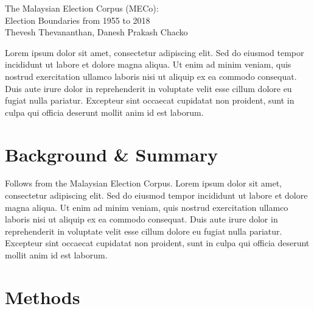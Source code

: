 \documentclass[11pt]{article}
\begin{document}
\def\acronymend{MECo}
\def\acronym{\acronymend\space}

\phantom{Thevesh}

\vfill

\begin{center}
	\begin{minipage}{0.88\linewidth}
		\begin{center}
			\LARGE
			The Malaysian Election Corpus (\acronymend):\\Election Boundaries from 1955 to 2018 \\[0.21in]
			\Large
			Thevesh Thevananthan, Danesh Prakash Chacko\\[0.15in]  %
		\end{center}
		\large 
		Lorem ipsum dolor sit amet, consectetur adipiscing elit. Sed do eiusmod tempor incididunt ut labore et dolore magna aliqua. Ut enim ad minim veniam, quis nostrud exercitation ullamco laboris nisi ut aliquip ex ea commodo consequat. Duis aute irure dolor in reprehenderit in voluptate velit esse cillum dolore eu fugiat nulla pariatur. Excepteur sint occaecat cupidatat non proident, sunt in culpa qui officia deserunt mollit anim id est laborum.
	\end{minipage}
\end{center}

\vfill

\phantom{Word Count:}

\newpage
{}

\def\TOTALBALLOTS{25,552}
\def\TOTALCONTESTS{9,705}
\def\TOTALPARTIES{99}
\def\TOTALCONTESTSSTATE{6,935}
\def\TOTALCONTESTSFEDERAL{2,770}
\def\TOTALELECTIONS{16}

\section*{Background \& Summary}
Follows from the Malaysian Election Corpus\cite{thevananthan2025meco}. Lorem ipsum dolor sit amet, consectetur adipiscing elit. Sed do eiusmod tempor incididunt ut labore et dolore magna aliqua. Ut enim ad minim veniam, quis nostrud exercitation ullamco laboris nisi ut aliquip ex ea commodo consequat. Duis aute irure dolor in reprehenderit in voluptate velit esse cillum dolore eu fugiat nulla pariatur. Excepteur sint occaecat cupidatat non proident, sunt in culpa qui officia deserunt mollit anim id est laborum.

\section*{Methods}
\end{document}
